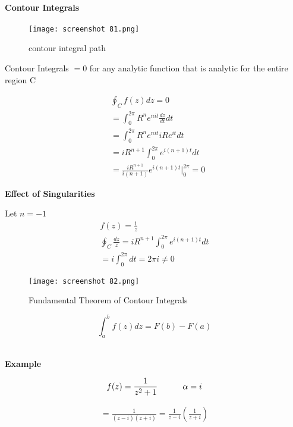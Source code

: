 \documentclass[svgnames]{article}   	%
\begin{document}
\paragraph{Contour Integrals}
\begin{figure}[H]
  \centering
    \texttt{[image: screenshot 81.png]}
    \caption{contour integral path}
\end{figure}


\vspace{5px}
Contour Integrals $ = 0$ for any analytic function that is analytic for the
entire region C

\begin{align*}
  &\oint_C f(z) dz = 0 \\
  &= \int_0^{2\pi} R^n e^{nit} \frac{dz}{dt}dt \\
  &= \int_0^{2\pi} R^n e^{nit} iRe^{it} dt  \\
  &= iR^{n+1} \int_0^{2\pi} e^{i(n+1)t} dt \\
  &= \frac{iR^{n+1}}{i(n+1)} e^{i(n+1)t} \Big|_0^{2\pi} = 0
\end{align*}

\textbf{Effect of Singularities}

Let $n = -1$
\begin{align*}
  f(z) = \frac{1}{z} \\
  \oint_C \frac{dz}{z} = iR^{n+1} \int_0^{2\pi} e^{i(n+1)t} dt \\
  = i \int_0^{2\pi} dt = 2\pi i \neq 0
\end{align*}

\begin{figure}[H]
  \centering
    \texttt{[image: screenshot 82.png]}
    \caption{Fundamental Theorem of Contour Integrals}
\end{figure}



\begin{tcolorbox}	
  
  \[
  \int_a^b f(z) dz = F(b) - F(a) 
  \]
  
  
\end{tcolorbox}	
\mbox{} \\
\textbf{Example}

\[
  f(z) = \frac{1}{z^2 + 1} \hspace{30px} \alpha = i
\]

\begin{align*}
  = \frac{1}{(z-i)(z+i)} = \frac{1}{z-i} \left(\frac{1}{z+i}\right)
\end{align*}
\end{document}
